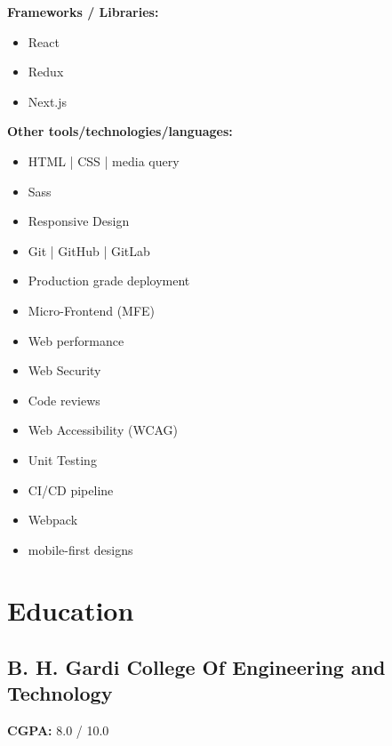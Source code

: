\documentclass[letterpaper]{deedy-resume} %
\begin{document}
\begin{minipage}[t]{0.33\textwidth}
\textbf{Frameworks / Libraries:}
\vspace{-\topsep}
\begin{itemize}
    \setlength\itemsep{-0.5em} %
    \item React
    \item Redux
    \item Next.js
\end{itemize}

\vspace{-\topsep}

\textbf{Other tools/technologies/languages:}
\vspace{-\topsep}
\begin{itemize}
    \setlength\itemsep{-0.5em} %
    \item HTML | CSS | media query
    \item Sass %
    \item Responsive Design
    \item Git | GitHub | GitLab
    \item Production grade deployment
    \item Micro-Frontend (MFE)
    \item Web performance
    \item Web Security
    \item Code reviews
    \item Web Accessibility (WCAG)
    \item Unit Testing
    \item CI/CD pipeline
    \item Webpack
    \item mobile-first designs
\end{itemize}
\vspace{-\topsep}



\section{Education} 

\subsection{B. H. Gardi College Of Engineering and Technology}
\textbf{CGPA:} 8.0 / 10.0


\end{minipage}
\end{document}
